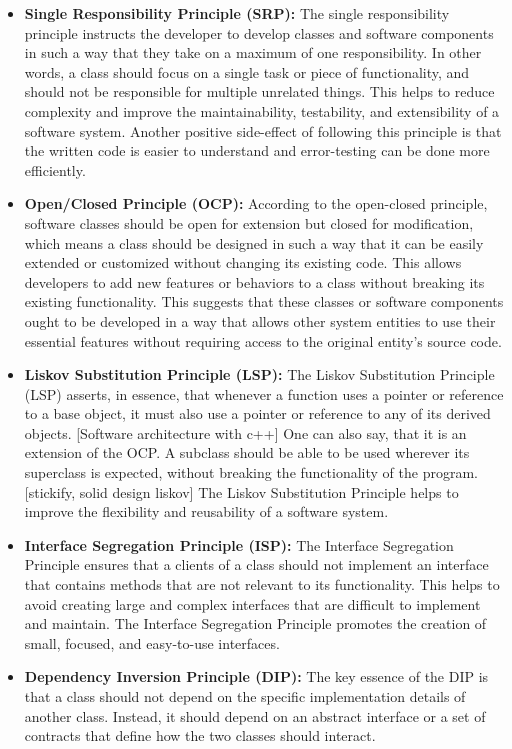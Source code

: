 \begin{itemize}
	\item \textbf{Single Responsibility Principle (SRP):}
	The single responsibility principle instructs the developer to develop classes and software components in such a way that they take on a maximum of one responsibility. In other words, a class should focus on a single task or piece of functionality, and should not be responsible for multiple unrelated things. This helps to reduce complexity and improve the maintainability, testability, and extensibility of a software system. Another positive side-effect of following this principle is that the written code is easier to understand and error-testing can be done more efficiently.
	
	\item \textbf{Open/Closed Principle (OCP):}
	According to the open-closed principle, software classes should be open for extension but closed for modification, which means a class should be designed in such a way that it can be easily extended or customized without changing its existing code. This allows developers to add new features or behaviors to a class without breaking its existing functionality. This suggests that these classes or software components ought to be developed in a way that allows other system entities to use their essential features without requiring access to the original entity's source code. 
	
	\item \textbf{Liskov Substitution Principle (LSP):}
	The Liskov Substitution Principle (LSP) asserts, in essence, that whenever a function uses a pointer or reference to a base object, it must also use a pointer or reference to any of its derived objects. [Software architecture with c++] One can also say, that it is an extension of the OCP. A subclass should be able to be used wherever its superclass is expected, without breaking the functionality of the program. [stickify, solid design liskov] The Liskov Substitution Principle helps to improve the flexibility and reusability of a software system.
	
	\item \textbf{Interface Segregation Principle (ISP):}
	The Interface Segregation Principle ensures that a clients of a class should not implement an interface that contains methods that are not relevant to its functionality. This helps to avoid creating large and complex interfaces that are difficult to implement and maintain. The Interface Segregation Principle promotes the creation of small, focused, and easy-to-use interfaces. 
	
	\item \textbf{Dependency Inversion Principle (DIP):}
	The key essence of the DIP is that a class should not depend on the specific implementation details of another class. Instead, it should depend on an abstract interface or a set of contracts that define how the two classes should interact.
\end{itemize}

